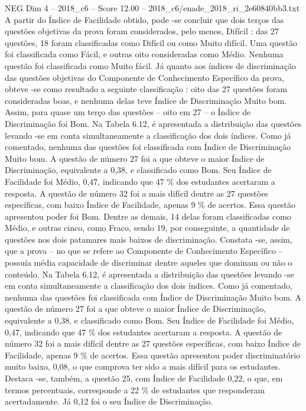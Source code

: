 \begin{textsample}{NEG Dim 4 – 2018\_c6 – Score 12.00 – 2018\_c6/enade\_2018\_ri\_2e60840bb3.txt}
A partir do Índice de Facilidade obtido, pode -se concluir que dois terços das questões objetivas da prova foram considerados, pelo menos, Difícil : das 27 questões, 18 foram classificadas como Difícil ou como Muito difícil.
Uma questão foi classificada como Fácil, e outras oito consideradas como Médio.
Nenhuma questão foi classificada como Muito fácil.
Já quanto aos índices de discriminação das questões objetivas do Componente de Conhecimento Específico da prova, obteve -se como resultado a seguinte classificação : oito das 27 questões foram consideradas boas, e nenhuma delas teve Índice de Discriminação Muito bom.
Assim, para quase um terço das questões – oito em 27 – o Índice de Discriminação foi Bom.
Na Tabela 6.12, é apresentada a distribuição das questões levando -se em conta simultaneamente a classificação dos dois índices.
Como já comentado, nenhuma das questões foi classificada com Índice de Discriminação Muito bom.
A questão de número 27 foi a que obteve o maior Índice de Discriminação, equivalente a 0,38, e classificado como Bom.
Seu Índice de Facilidade foi Médio, 0,47, indicando que 47 \% dos estudantes acertaram a resposta.
A questão de número 32 foi a mais difícil dentre as 27 questões específicas, com baixo Índice de Facilidade, apenas 9 \% de acertos.
Essa questão apresentou poder foi Bom.
Dentre as demais, 14 delas foram classificadas como Médio, e outras cinco, como Fraco, sendo 19, por conseguinte, a quantidade de questões nos dois patamares mais baixos de discriminação.
Constata -se, assim, que a prova – no que se refere ao Componente de Conhecimento Específico – possuía média capacidade de discriminar dentre aqueles que dominam ou não o conteúdo.
Na Tabela 6.12, é apresentada a distribuição das questões levando -se em conta simultaneamente a classificação dos dois índices.
Como já comentado, nenhuma das questões foi classificada com Índice de Discriminação Muito bom.
A questão de número 27 foi a que obteve o maior Índice de Discriminação, equivalente a 0,38, e classificado como Bom.
Seu Índice de Facilidade foi Médio, 0,47, indicando que 47 \% dos estudantes acertaram a resposta.
A questão de número 32 foi a mais difícil dentre as 27 questões específicas, com baixo Índice de Facilidade, apenas 9 \% de acertos.
Essa questão apresentou poder discriminatório muito baixo, 0,08, o que comprova ter sido a mais difícil para os estudantes.
Destaca -se, também, a questão 25, com Índice de Facilidade 0,22, o que, em termos percentuais, corresponde a 22 \% de estudantes que responderam acertadamente.
Já 0,12 foi o seu Índice de Discriminação.

\end{textsample}
